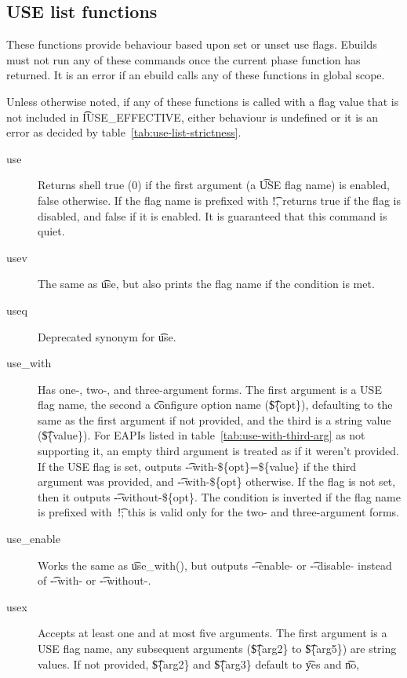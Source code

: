 \subsection{USE list functions}
These functions provide behaviour based upon set or unset use flags. Ebuilds must not run any of
these commands once the current phase function has returned. It is an error if an ebuild calls any
of these functions in global scope.

Unless otherwise noted, if any of these functions is called with a flag value that is not included
in \t{IUSE_EFFECTIVE}, either behaviour is undefined or it is an error as decided by
table~\ref{tab:use-list-strictness}.

\begin{description}
\item[use] Returns shell true (0) if the first argument (a \t{USE} flag name) is enabled, false
    otherwise.  If the flag name is prefixed with \t{!}, returns true if the flag is disabled, and
    false if it is enabled. It is guaranteed that this command is quiet.
\item[usev] The same as \t{use}, but also prints the flag name if the condition
    is met.
\item[useq] Deprecated synonym for \t{use}.
\item[use_with]  Has one-, two-, and three-argument forms. The first
    argument is a USE flag name, the second a \t{configure} option name (\t{\$\{opt\}}), defaulting
    to the same as the first argument if not provided, and the third is a string value
    (\t{\$\{value\}}). For EAPIs listed in table~\ref{tab:use-with-third-arg} as not supporting it,
    an empty third argument is treated as if it weren't provided. If the USE flag is set, outputs
    \t{-{}-with-\$\{opt\}=\$\{value\}} if the third argument was provided, and
    \t{-{}-with-\$\{opt\}} otherwise. If the flag is not set, then it outputs
    \t{-{}-without-\$\{opt\}}. The condition is inverted if the flag name is prefixed with~\t{!};
    this is valid only for the two- and three-argument forms.
\item[use_enable] Works the same as \t{use_with()}, but outputs \t{-{}-enable-} or
    \t{-{}-disable-} instead of \t{-{}-with-} or \t{-{}-without-}.
\item[usex]  Accepts at least one and at most five arguments. The first argument
    is a USE flag name, any subsequent arguments (\t{\$\{arg2\}} to \t{\$\{arg5\}}) are string
    values. If not provided, \t{\$\{arg2\}} and \t{\$\{arg3\}} default to \t{yes} and \t{no},

\end{description}

